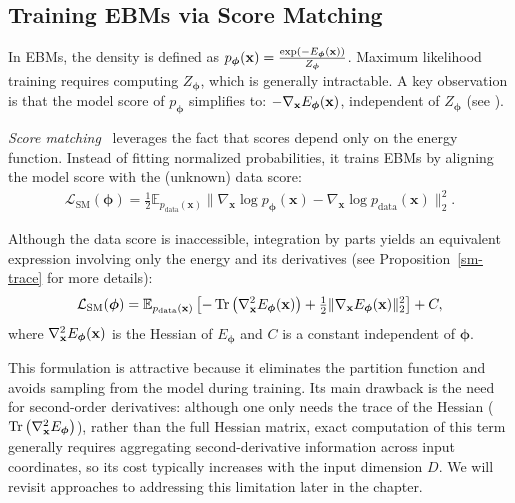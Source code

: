 \subsection{Training EBMs via Score Matching}\label{subsec:training-ebm}
In EBMs, the density is defined as $p_{{\bm{\phi}}}(\mathbf{x}) = \tfrac{\exp(-E_{\bm{\phi}}(\mathbf{x}))}{Z_{\bm{\phi}}}$. Maximum likelihood training requires computing $Z_{\bm{\phi}}$, which is generally intractable.  
A key observation is that the model score of $p_{{\bm{\phi}}}$ simplifies to: $-\nabla_{{\mathbf{x}}}E_{\bm{\phi}}({\mathbf{x}})$, independent of $Z_{\bm{\phi}}$ (see ).  

\emph{Score matching}~\citep{hyvarinen2005estimation} leverages the fact that scores depend only on the energy function.  
Instead of fitting normalized probabilities, it trains EBMs by aligning the model score with the (unknown) data score:
\begin{align}\label{eq:ebm-sm}
    \mathcal{L}_{\mathrm{SM}}(\bm{\phi}) 
= \tfrac{1}{2}  \mathbb{E}_{p_{\mathrm{data}}(\mathbf{x})} 
\big\| \nabla_{\mathbf{x}} \log p_{\bm{\phi}}(\mathbf{x}) 
- \nabla_{\mathbf{x}} \log p_{\mathrm{data}}(\mathbf{x}) \big\|_2^2.
\end{align}

Although the data score is inaccessible, integration by parts yields an equivalent expression involving only the energy and its derivatives (see Proposition~\ref{sm-trace} for more details):
\[
\mathcal{L}_{\mathrm{SM}}(\bm{\phi}) =
\mathbb{E}_{p_{\mathrm{data}}(\mathbf{x})} \left[
-\operatorname{Tr} \big(\nabla_{\mathbf{x}}^2 E_{\bm{\phi}}({\mathbf{x}})\big)
+ \tfrac{1}{2}  \|\nabla_{\mathbf{x}} E_{\bm{\phi}}({\mathbf{x}})\|_2^2
\right] + C,
\]
where $\nabla_{\mathbf{x}}^2 E_{\bm{\phi}}({\mathbf{x}})$ is the Hessian of $E_{\bm{\phi}}$ and $C$ is a constant independent of $\bm{\phi}$.  

This formulation is attractive because it eliminates the partition function and avoids sampling from the model during training.  
Its main drawback is the need for second-order derivatives: although one only needs the trace of the Hessian ($\operatorname{Tr} \big(\nabla_{\mathbf{x}}^2 E_{\bm{\phi}}\big)$), rather than the full Hessian matrix, exact computation of this term generally requires aggregating second-derivative information across input coordinates, so its cost typically increases with the input dimension $D$.  
We will revisit approaches to addressing this limitation later in the chapter.






